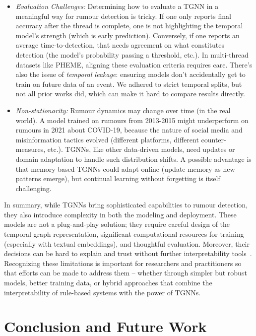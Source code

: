 \documentclass{cshonours}
\begin{document}
\begin{itemize}
\item \emph{Evaluation Challenges:} Determining how to evaluate a TGNN in a meaningful way for rumour detection is tricky. If one only reports final accuracy after the thread is complete, one is not highlighting the temporal model's strength (which is early prediction). Conversely, if one reports an average time-to-detection, that needs agreement on what constitutes detection (the model's probability passing a threshold, etc.). In multi-thread datasets like PHEME, aligning these evaluation criteria requires care. There's also the issue of \textit{temporal leakage}: ensuring models don't accidentally get to train on future data of an event. We adhered to strict temporal splits, but not all prior works did, which can make it hard to compare results directly.

\item \emph{Non-stationarity:} Rumour dynamics may change over time (in the real world). A model trained on rumours from 2013-2015 might underperform on rumours in 2021 about COVID-19, because the nature of social media and misinformation tactics evolved (different platforms, different counter-measures, etc.). TGNNs, like other data-driven models, need updates or domain adaptation to handle such distribution shifts. A possible advantage is that memory-based TGNNs could adapt online (update memory as new patterns emerge), but continual learning without forgetting is itself challenging.
\end{itemize}

In summary, while TGNNs bring sophisticated capabilities to rumour detection, they also introduce complexity in both the modeling and deployment. These models are not a plug-and-play solution; they require careful design of the temporal graph representation, significant computational resources for training (especially with textual embeddings), and thoughtful evaluation. Moreover, their decisions can be hard to explain and trust without further interpretability tools~\cite{Li2023Zebra,Wang2025Challenging,Focal2025Understanding}. Recognizing these limitations is important for researchers and practitioners so that efforts can be made to address them – whether through simpler but robust models, better training data, or hybrid approaches that combine the interpretability of rule-based systems with the power of TGNNs.



\chapter{Conclusion and Future Work}
\end{document}
